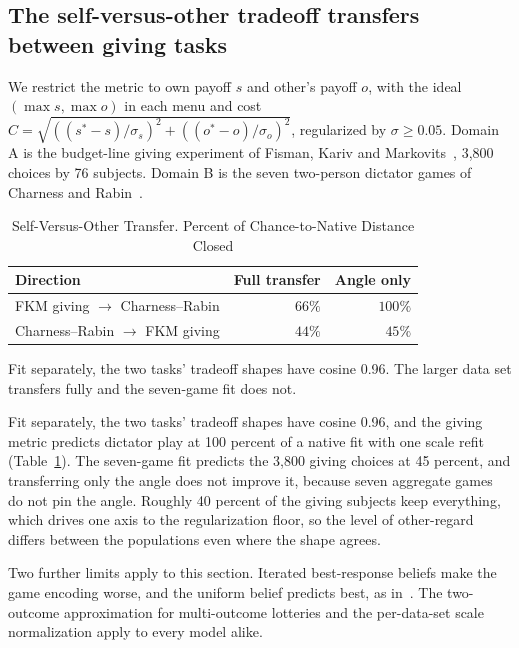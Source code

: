 \documentclass[journal]{IEEEtran}
\begin{document}
\subsection{The self-versus-other tradeoff transfers between giving tasks}
We restrict the metric to own payoff $s$ and other's payoff $o$, with the ideal $(\max s,\max o)$ in each menu and cost $C=\sqrt{((s^*-s)/\sigma_s)^2+((o^*-o)/\sigma_o)^2}$, regularized by $\sigma\geq0.05$.
Domain A is the budget-line giving experiment of Fisman, Kariv and Markovits~\cite{fisman2007}, 3{,}800 choices by 76 subjects.
Domain B is the seven two-person dictator games of Charness and Rabin~\cite{charness2002}.

\begin{table}[!t]
\renewcommand{\arraystretch}{1.15}
\caption{Self-Versus-Other Transfer. Percent of Chance-to-Native Distance Closed}
\label{tab:social}
\centering
\begin{tabular}{l r r}
\toprule
\textbf{Direction} & \textbf{Full transfer} & \textbf{Angle only} \\
\midrule
FKM giving $\to$ Charness--Rabin & $66\%$ & $100\%$ \\
Charness--Rabin $\to$ FKM giving & $44\%$ & $45\%$ \\
\bottomrule
\end{tabular}
\begin{flushleft}
\footnotesize{Fit separately, the two tasks' tradeoff shapes have cosine 0.96. The larger data set transfers fully and the seven-game fit does not.}
\end{flushleft}
\end{table}

Fit separately, the two tasks' tradeoff shapes have cosine 0.96, and the giving metric predicts dictator play at 100 percent of a native fit with one scale refit (Table~\ref{tab:social}).
The seven-game fit predicts the 3{,}800 giving choices at 45 percent, and transferring only the angle does not improve it, because seven aggregate games do not pin the angle.
Roughly 40 percent of the giving subjects keep everything, which drives one axis to the regularization floor, so the level of other-regard differs between the populations even where the shape agrees.

Two further limits apply to this section.
Iterated best-response beliefs make the game encoding worse, and the uniform belief predicts best, as in~\cite{wright2017}.
The two-outcome approximation for multi-outcome lotteries and the per-data-set scale normalization apply to every model alike.
\end{document}
